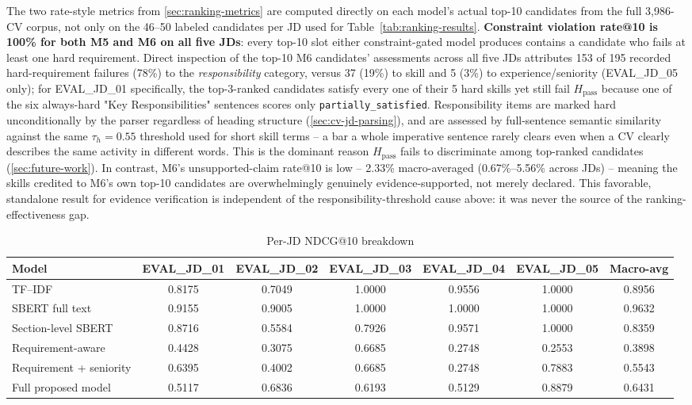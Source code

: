 \documentclass[12pt,a4paper,oneside]{report}
\begin{document}
The two rate-style metrics from \cref{sec:ranking-metrics} are computed directly on each model's actual top-10 candidates from the full 3,986-CV corpus, not only on the 46--50 labeled candidates per JD used for Table~\ref{tab:ranking-results}. \textbf{Constraint violation rate@10 is 100\% for both M5 and M6 on all five JDs}: every top-10 slot either constraint-gated model produces contains a candidate who fails at least one hard requirement. Direct inspection of the top-10 M6 candidates' assessments across all five JDs attributes 153 of 195 recorded hard-requirement failures (78\%) to the \emph{responsibility} category, versus 37 (19\%) to skill and 5 (3\%) to experience/seniority (EVAL\_JD\_05 only); for EVAL\_JD\_01 specifically, the top-3-ranked candidates satisfy every one of their 5 hard skills yet still fail $H_{\mathrm{pass}}$ because one of the six always-hard "Key Responsibilities" sentences scores only \texttt{partially\_satisfied}. Responsibility items are marked hard unconditionally by the parser regardless of heading structure (\cref{sec:cv-jd-parsing}), and are assessed by full-sentence semantic similarity against the same $\tau_h{=}0.55$ threshold used for short skill terms -- a bar a whole imperative sentence rarely clears even when a CV clearly describes the same activity in different words. This is the dominant reason $H_{\mathrm{pass}}$ fails to discriminate among top-ranked candidates (\cref{sec:future-work}). In contrast, M6's unsupported-claim rate@10 is low -- 2.33\% macro-averaged (0.67\%--5.56\% across JDs) -- meaning the skills credited to M6's own top-10 candidates are overwhelmingly genuinely evidence-supported, not merely declared. This favorable, standalone result for evidence verification is independent of the responsibility-threshold cause above: it was never the source of the ranking-effectiveness gap.

\begin{table}[htbp]
\centering
\caption{Per-JD NDCG@10 breakdown}
\label{tab:per-jd-ndcg10}
\begin{adjustbox}{max width=\textwidth}
\begin{tabular}{lcccccc}
\toprule
Model & EVAL\_JD\_01 & EVAL\_JD\_02 & EVAL\_JD\_03 & EVAL\_JD\_04 & EVAL\_JD\_05 & Macro-avg \\
\midrule
TF--IDF & 0.8175 & 0.7049 & 1.0000 & 0.9556 & 1.0000 & 0.8956 \\
SBERT full text & 0.9155 & 0.9005 & 1.0000 & 1.0000 & 1.0000 & 0.9632 \\
Section-level SBERT & 0.8716 & 0.5584 & 0.7926 & 0.9571 & 1.0000 & 0.8359 \\
Requirement-aware & 0.4428 & 0.3075 & 0.6685 & 0.2748 & 0.2553 & 0.3898 \\
Requirement + seniority & 0.6395 & 0.4002 & 0.6685 & 0.2748 & 0.7883 & 0.5543 \\
Full proposed model & 0.5117 & 0.6836 & 0.6193 & 0.5129 & 0.8879 & 0.6431 \\
\bottomrule
\end{tabular}
\end{adjustbox}
\end{table}
\end{document}

